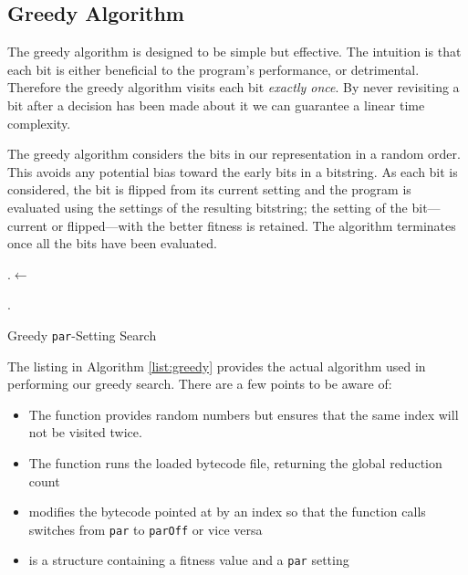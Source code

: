 \subsection{Greedy Algorithm}

The greedy algorithm is designed to be simple but effective. The intuition is
that each bit is either beneficial to the program's performance, or
detrimental. Therefore the greedy algorithm visits each bit \emph{exactly
once}. By never revisiting a bit after a decision has been made about it we can
guarantee a linear time complexity.

The greedy algorithm considers the bits in our representation in a random
order.  This avoids any potential bias toward the early bits in a bitstring.
As each bit is considered, the bit is flipped from its current setting and the
program is evaluated using the settings of the resulting bitstring; the setting
of the bit---current or flipped---with the better fitness is retained.  The
algorithm terminates once all the bits have been evaluated.


\begin{algorithm}
\DontPrintSemicolon
{}

\BlankLine

\Best.\Fitness $\leftarrow$ \evaluateProg{}\;
\BlankLine

\BlankLine
\Return \Best.\Setting\;
\caption{Greedy \texttt{par}-Setting Search}
\label{list:greedy}
\end{algorithm}

The listing in Algorithm \ref{list:greedy} provides the actual algorithm used
in performing our greedy search. There are a few points to be aware of:

\begin{itemize}
  \item The function  provides random numbers but ensures
        that the same index will not be visited twice.
  \item The function  runs the loaded bytecode file,
        returning the global reduction count
  \item {} modifies the bytecode pointed at by an index so that
        the function calls switches from \verb|par| to \verb|parOff| or vice versa
  \item {} is a structure containing a fitness value and a \verb|par|
        setting
\end{itemize}


